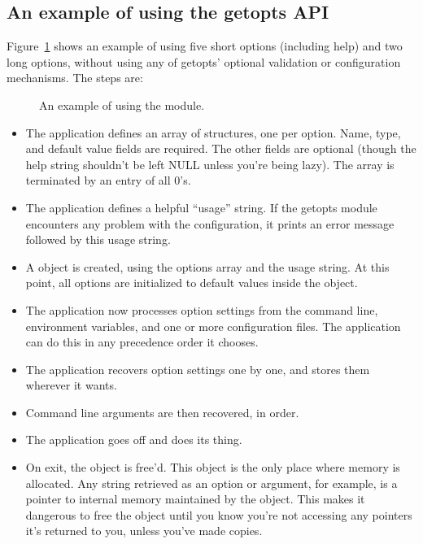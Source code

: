 \subsection{An example of using the getopts API}

Figure~\ref{fig:getopts_example} shows an example of using five short
options (including help) and two long options, without using any of
getopts' optional validation or configuration mechanisms. The steps
are:

\begin{figure}

\caption{An example of using the  module.}
\label{fig:getopts_example}
\end{figure}

\begin{itemize}
\item The application defines an array of 
      structures, one per option. Name, type, and default value fields
      are required. The other fields are optional (though the help
      string shouldn't be left NULL unless you're being lazy). The
      array is terminated by an entry of all 0's.

\item The application defines a helpful ``usage'' string. If the getopts
      module encounters any problem with the configuration, it prints
      an error message followed by this usage string.

\item A  object is created, using the options
      array and the usage string. At this point, all options are 
      initialized to default values inside the object.

\item The application now processes option settings from the command
      line, environment variables, and one or more configuration
      files. The application can do this in any precedence order it
      chooses.
 
\item The application recovers option settings one by one, and stores
      them wherever it wants. 

\item Command line arguments are then recovered, in order.

\item The application goes off and does its thing.

\item On exit, the  object is free'd. This 
      object is the only place where memory is allocated. Any string
      retrieved as an option or argument, for example, is a pointer
      to internal memory maintained by the object. This makes it
      dangerous to free the object until you know you're not accessing
      any pointers it's returned to you, unless you've made copies.
\end{itemize}

